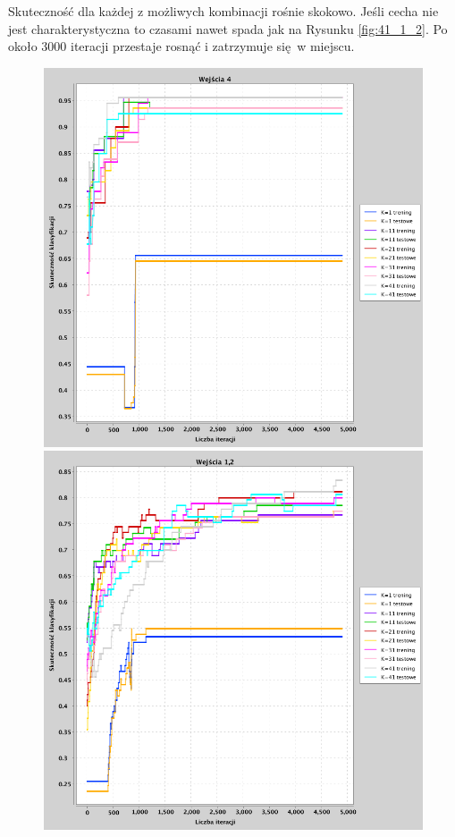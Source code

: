 \documentclass[a4paper, portrait,11pt]{article}
\begin{document}
Skuteczność dla każdej z możliwych kombinacji rośnie skokowo. Jeśli cecha nie jest charakterystyczna to czasami nawet spada jak na Rysunku \ref{fig:41_1_2}.
Po około 3000 iteracji przestaje rosnąć i zatrzymuje się w miejscu.

\begin{figure}[!htb]
  \begin{minipage}{0.33\textwidth}
    \centering
    \includegraphics[width=1\linewidth]{../data/classification4/1/1_4.png}
    \caption{\label{fig:41_1_4}}
  \end{minipage}
  \begin{minipage}{0.33\textwidth}
    \centering
    \includegraphics[width=1\linewidth]{../data/classification4/1/2_1,2.png}

\end{minipage}
\end{figure}
\end{document}
